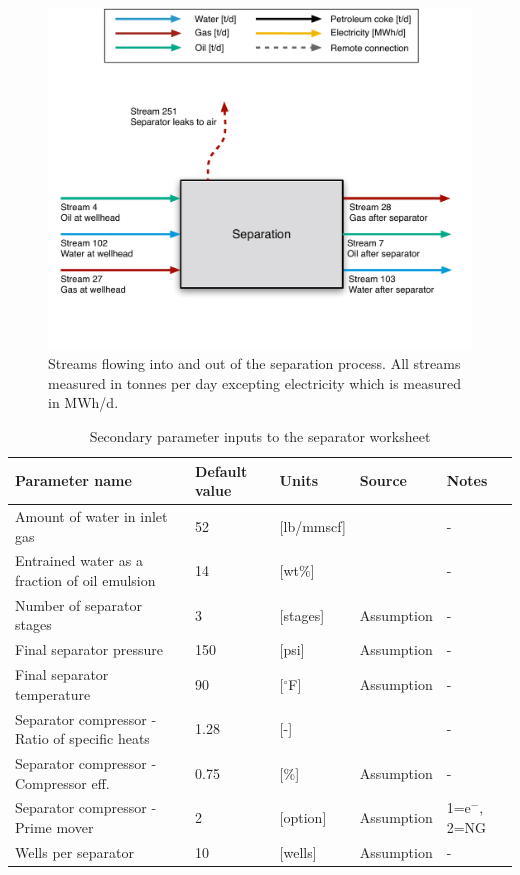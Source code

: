 \documentclass[11pt]{report}
\begin{document}
\begin{figure}
\includegraphics[width=0.85\columnwidth]{images/separation_PF.pdf}
\caption{Streams flowing into and out of the separation process. All streams measured in tonnes per day excepting electricity which is measured in MWh/d.}
\label{fig:separation_PF}
\end{figure}



\begin{table}
\caption{Secondary parameter inputs to the separator worksheet}
\label{tab:separator_SI}
\begin{scriptsize}
\begin{tabularx}{1\columnwidth}{p{}p{}p{}p{}p{}}
\toprule
Parameter name						& Default value   		& Units 	& Source			      							& Notes 		\\ 
\midrule
Amount of water in inlet gas	 			& 52					& [lb/mmscf]	&  \cite[p. 160]{Manning1991}				& -			\\
Entrained water as a fraction of oil emulsion	& 14					& [wt\%]			& \cite{Manning1991}					& -			\\
Number of separator stages				& 3					& [stages] 		& Assumption							& -			\\
Final separator pressure					& 150				& [psi]			& Assumption							& -			\\
Final separator temperature				& 90					& [$^\circ$F]		& Assumption							& -			\\
Separator compressor - Ratio of specific heats	& 1.28				& [-]				& \cite{McAllister2009}					& -			\\
Separator compressor - Compressor eff.		& 0.75				& [\%]			& Assumption							& -			\\
Separator compressor - Prime mover		& 2					& [option]			& Assumption							& 1=e$^-$, 2=NG \\
Wells per separator						& 10					& [wells]			& Assumption							& -			\\
\bottomrule
\end{tabularx}
\end{scriptsize}
\end{table}
\end{document}
